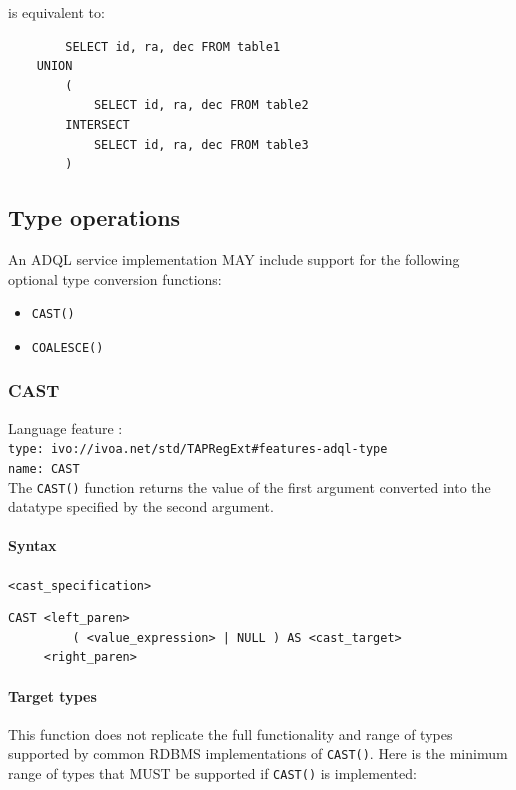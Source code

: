 \documentclass[11pt,a4paper]{ivoa}
\begin{document}
is equivalent to:

\begin{verbatim}
        SELECT id, ra, dec FROM table1
    UNION
        (
            SELECT id, ra, dec FROM table2
        INTERSECT
            SELECT id, ra, dec FROM table3
        )
\end{verbatim}

\subsection{Type operations}
\label{sec:type}

An ADQL service implementation MAY include support for the following optional
type conversion functions: 

\begin{itemize}
    \item \verb:CAST():
    \item \verb:COALESCE():
\end{itemize}

\subsubsection{CAST}
\label{sec:type.cast}
{\footnotesize Language feature :}\\
{\footnotesize \verb|type: ivo://ivoa.net/std/TAPRegExt#features-adql-type|}\\
{\footnotesize \verb|name: CAST|}\\

The \verb:CAST(): function returns the value of the first argument converted
into the datatype specified by the second argument.

\paragraph{Syntax} \verb:<cast_specification>:
\begin{verbatim}
CAST <left_paren>
         ( <value_expression> | NULL ) AS <cast_target>
     <right_paren>
\end{verbatim}

\paragraph{Target types}

This function does not replicate the full functionality and range of types
supported by common RDBMS implementations of \verb:CAST():. Here is the minimum
range of types that MUST be supported if \verb:CAST(): is implemented:
\end{document}
